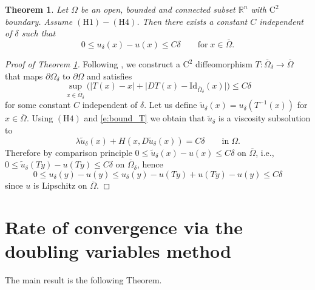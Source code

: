 \documentclass[11pt,reqno]{amsart}
\numberwithin{figure}{section}
\theoremstyle{plain}
\newtheorem{thm}{Theorem}[section]
\theoremstyle{remark}
\numberwithin{equation}{section}
\newcommand{\rmC}{\mathrm{C}}
\begin{document}
\begin{thm}\cite{Capuzzo-Dolcetta1990}\label{thm:conv_general} Let $\Omega$ be an open, bounded and connected subset $\mathbb{R}^n$ with $\mathrm{C}^2$ boundary. Assume $\mathrm{(H1)}-\mathrm{(H4)}$. 
Then there exists a constant $C$ independent of $\delta$ such that
\begin{equation*}
    0\leq u_\delta(x) - u(x) \leq C\delta \qquad\text{for}\; x\in \overline{\Omega}.
\end{equation*}
\end{thm}
\begin{proof}[Proof of Theorem \ref{thm:conv_general}] Following \cite{Capuzzo-Dolcetta1990}, we construct a $\rmC^2$ diffeomorphism $T:\overline{\Omega}_\delta\to \overline{\Omega}$ that maps $\partial\Omega_\delta$ to $\partial\Omega$ and satisfies
\begin{equation}\label{e:bound_T}
    \sup_{x\in \overline{\Omega}_\delta}\Big(|T(x)-x| + \big|DT(x) - \mathrm{Id}_{\overline{\Omega}_\delta}(x)\big|\Big) \leq C\delta
\end{equation}
for some constant $C$ independent of $\delta$. Let us define $\tilde{u}_\delta(x) = u_\delta\left(T^{-1}(x)\right)$ for $x\in \overline{\Omega}$. Using $\mathrm{(H4)}$ and \eqref{e:bound_T} we obtain that $\tilde{u}_\delta$ is a viscosity subsolution to
\begin{equation*}
    \lambda \tilde{u}_\delta(x) + H(x,D\tilde{u}_\delta(x))  = C\delta \qquad\text{in}\;\Omega.
\end{equation*}
Therefore by comparison principle $0\leq \tilde{u}_\delta(x) - u(x) \leq C\delta$ on $\overline{\Omega}$, i.e., $0\leq \tilde{u}_\delta(Ty) - u(Ty) \leq C\delta$ on $\overline{\Omega}_\delta$, hence
\begin{equation*}
    0 \leq u_\delta(y) - u(y) \leq u_\delta(y) - u(Ty) + u(Ty) - u(y) \leq C\delta
\end{equation*}
since $u$ is Lipschitz on $\overline{\Omega}$.
\end{proof}


\section{Rate of convergence via the doubling variables method}
\noindent The main result is the following Theorem.
\end{document}
